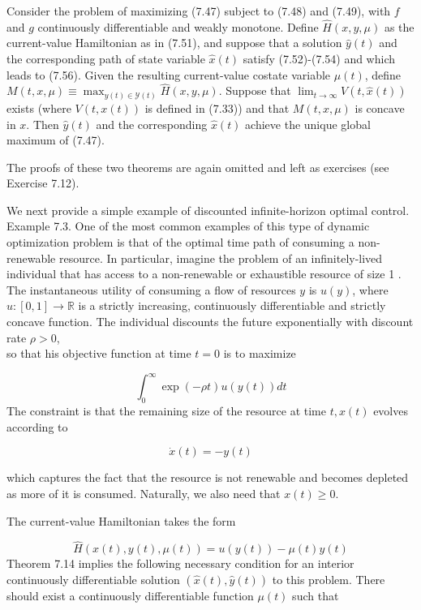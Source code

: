 \documentclass[\topdir/lecture_notes.tex]{subfiles}
\begin{document}
\begin{theorem}
Consider the problem of maximizing (7.47) subject to (7.48) and (7.49), with $f$ and $g$ continuously differentiable and weakly monotone. Define $\hat{H}(x, y, \mu)$ as the current-value Hamiltonian as in (7.51), and suppose that a solution $\hat{y}(t)$ and the corresponding path of state variable $\hat{x}(t)$ satisfy (7.52)-(7.54) and which leads to (7.56). Given the resulting current-value costate variable $\mu(t)$, define $M(t, x, \mu) \equiv \max _{y(t) \in \mathcal{Y}(t)} \hat{H}(x, y, \mu)$. Suppose that $\lim _{t \rightarrow \infty} V(t, \hat{x}(t))$ exists (where $V(t, x(t))$ is defined in (7.33)) and that $M(t, x, \mu)$ is concave in $x$. Then $\hat{y}(t)$ and the corresponding $\hat{x}(t)$ achieve the unique global maximum of (7.47).
\end{theorem}

The proofs of these two theorems are again omitted and left as exercises (see Exercise 7.12).

We next provide a simple example of discounted infinite-horizon optimal control.\\
Example 7.3. One of the most common examples of this type of dynamic optimization problem is that of the optimal time path of consuming a non-renewable resource. In particular, imagine the problem of an infinitely-lived individual that has access to a non-renewable or exhaustible resource of size 1 . The instantaneous utility of consuming a flow of resources $y$ is $u(y)$, where $u:[0,1] \rightarrow \mathbb{R}$ is a strictly increasing, continuously differentiable and strictly concave function. The individual discounts the future exponentially with discount rate $\rho>0$,\\
so that his objective function at time $t=0$ is to maximize

\[
\int_{0}^{\infty} \exp (-\rho t) u(y(t)) d t
\]
The constraint is that the remaining size of the resource at time $t, x(t)$ evolves according to

\[
\dot{x}(t)=-y(t)
\]

which captures the fact that the resource is not renewable and becomes depleted as more of it is consumed. Naturally, we also need that $x(t) \geq 0$.

The current-value Hamiltonian takes the form

\[
\hat{H}(x(t), y(t), \mu(t))=u(y(t))-\mu(t) y(t)
\]
Theorem 7.14 implies the following necessary condition for an interior continuously differentiable solution $(\hat{x}(t), \hat{y}(t))$ to this problem. There should exist a continuously differentiable function $\mu(t)$ such that
\end{document}
